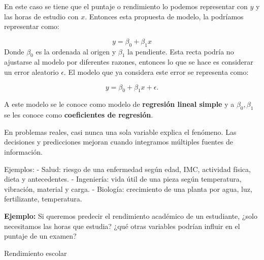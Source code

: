 \documentclass[
]{book}
\begin{document}
En este caso se tiene que el puntaje o rendimiento lo podemos representar con \(y\) y las horas de estudio con \(x\). Entonces esta propuesta de modelo, la podríamos representar como:

\[y=\beta_0+\beta_1x\]
Donde \(\beta_0\) es la ordenada al origen y \(\beta_1\) la pendiente. Esta recta podría no ajustarse al modelo por diferentes razones, entonces lo que se hace es considerar un error aleatorio \(\epsilon\). El modelo que ya considera este error se representa como:

\[y=\beta_0+\beta_1x+\epsilon.\]

A este modelo se le conoce como modelo de \textbf{regresión lineal simple} y a \(\beta_0,\beta_1\) se les conoce como \textbf{coeficientes de regresión}.

En problemas reales, casi nunca una sola variable explica el fenómeno. Las decisiones y predicciones mejoran cuando integramos múltiples fuentes de información.

Ejemplos:
- Salud: riesgo de una enfermedad según edad, IMC, actividad física, dieta y antecedentes.
- Ingeniería: vida útil de una pieza según temperatura, vibración, material y carga.
- Biología: crecimiento de una planta por agua, luz, fertilizante, temperatura.

\textbf{Ejemplo:} Si queremos predecir el rendimiento académico de un estudiante, ¿solo necesitamos las horas que estudia? ¿qué otras variables podrían influir en el puntaje de un examen?

Rendimiento escolar
\end{document}
